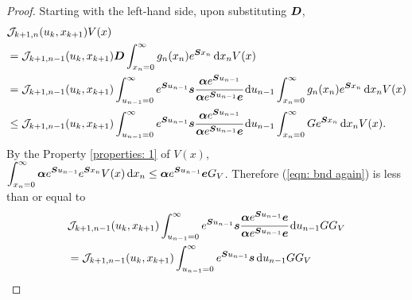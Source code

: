 \begin{proof}
	Starting with the left-hand side, upon substituting \(\boldsymbol{D}\), 
	\begin{align}
		& \mathcal J_{k+1,n}(u_k,x_{k+1})  V(x)  \nonumber 
		\\&= \mathcal J_{k+1,n-1}(u_k,x_{k+1})  \boldsymbol{D}
		\int_{x_n=0}^\infty g_{n}(x_n) e^{\boldsymbol{S}x_n} \, \mathrm{d} x_nV(x) \nonumber
		\\&= \mathcal J_{k+1,n-1}(u_k,x_{k+1})  \int_{u_{n-1}=0}^\infty e^{\boldsymbol{S}u_{n-1}}\boldsymbol s \cfrac{\boldsymbol \alpha e^{\boldsymbol{S}u_{n-1}}}{\boldsymbol \alpha e^{\boldsymbol{S}u_{n-1}}\boldsymbol e}\, \mathrm{d}  u_{n-1}
		\int_{x_n=0}^\infty g_{n}(x_n) e^{\boldsymbol{S}x_n} \, \mathrm{d} x_nV(x) \nonumber
		\\&\leq \mathcal J_{k+1,n-1}(u_k,x_{k+1})  \int_{u_{n-1}=0}^\infty e^{\boldsymbol{S}u_{n-1}}\boldsymbol s \cfrac{\boldsymbol \alpha e^{\boldsymbol{S}u_{n-1}}}{\boldsymbol \alpha e^{\boldsymbol{S}u_{n-1}}\boldsymbol e}\, \mathrm{d}  u_{n-1}
		\int_{x_n=0}^\infty G e^{\boldsymbol{S}x_n} \, \mathrm{d} x_nV(x). \label{eqn: bnd again}
	\end{align}
	By the Property \ref{properties: 1} of \(V(x)\), \(\displaystyle\int_{x_n=0}^\infty \boldsymbol \alpha e^{\boldsymbol{S}u_{n-1}}e^{\boldsymbol{S}x_n} V(x) \, \mathrm{d} x_n  \leq \boldsymbol \alpha e^{\boldsymbol{S}u_{n-1}}\boldsymbol eG_V\). Therefore (\ref{eqn: bnd again}) is less than or equal to 
	\begin{align}
		&\mathcal J_{k+1,n-1}(u_k,x_{k+1})  \int_{u_{n-1}=0}^\infty e^{\bs{S}u_{n-1}}\bs s \cfrac{\bs \alpha e^{\bs{S}u_{n-1}}\bs e}{\bs \alpha e^{\bs{S}u_{n-1}}\bs e}\wrt  u_{n-1} G  G_V\nonumber 
		\\& = \mathcal J_{k+1,n-1}(u_k,x_{k+1})  \int_{u_{n-1}=0}^\infty e^{\bs{S}u_{n-1}}\bs s \wrt  u_{n-1} G  G_V\nonumber

\end{align}
\end{proof}
